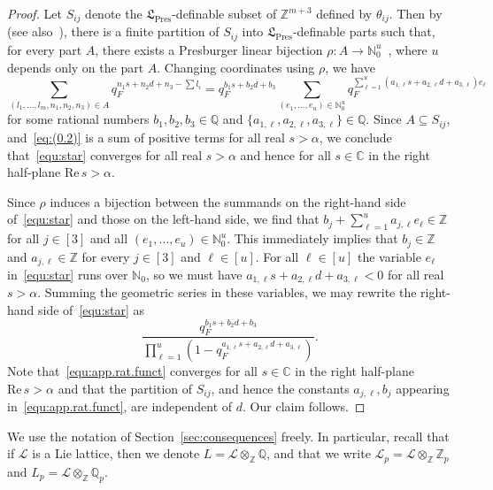 \documentclass[11pt,a4paper]{amsart}
\theoremstyle{plain}
\theoremstyle{remark}
\newcommand{\N}{\mathbb{N}}
\newcommand{\Z}{\mathbb{Z}}
\newcommand{\Q}{\mathbb{Q}}
\newcommand{\C}{\mathbb{C}}
\newcommand{\tensor}{\otimes}
\begin{document}
\begin{proof}
Let $S_{ij}$ denote the $\mathfrak{L}_{\mathrm{Pres}}$-definable
subset of $\mathbb{Z}^{m+3}$ defined by $\theta_{ij}$.  Then by~\cite[Theorem~2]{Cluckers/03} (see also~\cite[Theorem~2.1.9]{CGH/14}),
there is a finite partition of $S_{ij}$ into $\mathfrak{L}_{\mathrm{Pres}}$-definable
parts such that, for every part $A$, there exists a Presburger linear bijection $\rho:A\rightarrow \N_0^u$~\cite[Definition~1]{Cluckers/03}, where
$u$ depends only on the part $A$.  Changing coordinates using $\rho$,
we have 
\begin{equation} \label{equ:star}
\sum_{(l_{1},...,l_{m},n_{1},n_{2},n_{3}) \in A}q_{F}^{n_{1}s+n_{2}d+n_{3}-\sum l_{i}}=q_{F}^{b_{1}s+b_{2}d+b_{3}}\sum_{(e_{1},...,e_{u})\in \N_0^u}q_{F}^{\sum_{\ell=1}^{u}(a_{1,\ell}s+a_{2,\ell}d+a_{3,\ell})e_{\ell}}
\end{equation}
for some rational numbers $b_{1},b_{2},b_{3}\in\mathbb{Q}$ and $\{a_{1,\ell}, a_{2,\ell}, a_{3,\ell} \}\in\mathbb{Q}$.
Since $A \subseteq S_{ij}$, and~\eqref{eq:(0.2)} is a sum of positive terms for all real $s > \alpha$,
we conclude that~\eqref{equ:star} converges for all real $s > \alpha$ and hence for all $s \in \C$ in the right half-plane $\mathrm{Re} \, s > \alpha$.  

Since $\rho$ induces a bijection between the summands on the right-hand side of~\eqref{equ:star} and those on the left-hand side, we find that $b_j + \sum_{\ell = 1}^u a_{j,\ell} e_\ell \in \Z$ for all $j \in [3]$ and all $(e_1, \dots, e_u) \in \N_0^u$. 
This immediately implies that $b_j \in \Z$ and $a_{j, \ell} \in \Z$ for every $j \in [3]$ and $\ell \in [u]$.
For all $\ell \in [u]$ the variable $e_\ell$ in~\eqref{equ:star} runs over $\N_0$, so we must have $a_{1, \ell} s + a_{2, \ell}d + a_{3, \ell} < 0$ for all real $s > \alpha$.  Summing the geometric series in these variables, we may rewrite the right-hand side of~\eqref{equ:star} as
\begin{equation} \label{equ:app.rat.funct}
\frac{q_{F}^{b_{1}s+b_{2}d+b_{3}}}{\prod_{\ell=1}^{u}\left(1-q_F^{a_{1,\ell}s+a_{2,\ell}d+a_{3,\ell}}\right)}.
\end{equation}
Note that~\eqref{equ:app.rat.funct} converges for all $s \in \C$ in the right half-plane $\mathrm{Re} \, s > \alpha$ and that the partition of $S_{ij}$, and hence the constants $a_{j, \ell}, b_j$ appearing in~\eqref{equ:app.rat.funct}, are independent of $d$.  Our claim follows.
\end{proof}




We use the notation of Section~\ref{sec:consequences} freely.  In particular, recall that if $\mathcal{L}$ is a Lie lattice, then we denote $L = \mathcal{L} \tensor_\Z \Q$, and that we write $\mathcal{L}_p = \mathcal{L} \tensor_\Z \Z_p$ and $L_p = \mathcal{L} \tensor_\Z \Q_p$.  
\end{document}
